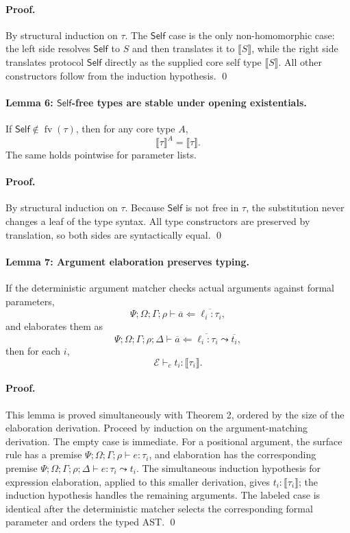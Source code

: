 \documentclass[manuscript,nonacm]{acmart}
\newcommand{\kw}[1]{\ensuremath{\mathsf{#1}}}
\newcommand{\Self}{\kw{Self}\xspace}
\newcommand{\fv}{\operatorname{fv}}
\newcommand{\has}{\vdash}
\newcommand{\elab}{\leadsto}
\newcommand{\trans}[1]{\llbracket #1 \rrbracket}
\newcommand{\transSelf}[2]{\llbracket #2 \rrbracket^{#1}}
\begin{document}
\paragraph{Proof.}
By structural induction on $\tau$.
The \Self case is the only non-homomorphic case: the left side resolves \Self to $S$ and then translates it to $\trans{S}$, while the right side translates protocol \Self directly as the supplied core self type $\trans{S}$.
All other constructors follow from the induction hypothesis.
\qed

\paragraph{Lemma 6: \Self-free types are stable under opening existentials.}
If $\Self\notin\fv(\tau)$, then for any core type $A$,
\[
  \transSelf{A}{\tau}=\trans{\tau}.
\]
The same holds pointwise for parameter lists.

\paragraph{Proof.}
By structural induction on $\tau$.
Because \Self is not free in $\tau$, the substitution never changes a leaf of the type syntax.
All type constructors are preserved by translation, so both sides are syntactically equal.
\qed

\paragraph{Lemma 7: Argument elaboration preserves typing.}
If the deterministic argument matcher checks actual arguments against formal parameters,
\[
  \Psi;\Omega;\Gamma;\rho
    \has \overline{a}\Leftarrow\overline{\ell_i:\tau_i},
\]
and elaborates them as
\[
  \Psi;\Omega;\Gamma;\rho;\Delta
    \has \overline{a}\Leftarrow\overline{\ell_i:\tau_i}
    \elab \overline{t_i},
\]
then for each $i$,
\[
  \mathcal{E}\has_c t_i:\trans{\tau_i}.
\]

\paragraph{Proof.}
This lemma is proved simultaneously with Theorem 2, ordered by the size of the elaboration derivation.
Proceed by induction on the argument-matching derivation.
The empty case is immediate.
For a positional argument, the surface rule has a premise
$\Psi;\Omega;\Gamma;\rho\has e:\tau_i$, and elaboration has the corresponding premise
$\Psi;\Omega;\Gamma;\rho;\Delta\has e:\tau_i\elab t_i$.
The simultaneous induction hypothesis for expression elaboration, applied to this smaller derivation, gives
$t_i:\trans{\tau_i}$; the induction hypothesis handles the remaining arguments.
The labeled case is identical after the deterministic matcher selects the corresponding formal parameter and orders the typed AST.
\qed
\end{document}
